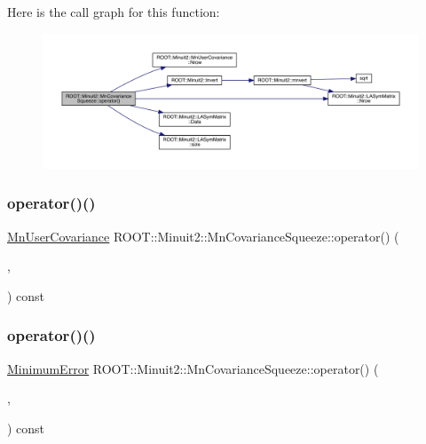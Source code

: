 Here is the call graph for this function\+:\nopagebreak
\begin{figure}[H]
\begin{center}
\leavevmode
\includegraphics[width=350pt]{dc/d44/classROOT_1_1Minuit2_1_1MnCovarianceSqueeze_af75da2b8e6e20a5477a6b0ceac4efb3a_cgraph}
\end{center}
\end{figure}
\mbox{\label{classROOT_1_1Minuit2_1_1MnCovarianceSqueeze_af75da2b8e6e20a5477a6b0ceac4efb3a}} 
\subsubsection{\texorpdfstring{operator()()}{operator()()}\hspace{0.1cm}{\footnotesize\ttfamily [2/6]}}
{\footnotesize\ttfamily \mbox{\hyperlink{classROOT_1_1Minuit2_1_1MnUserCovariance}{Mn\+User\+Covariance}} R\+O\+O\+T\+::\+Minuit2\+::\+Mn\+Covariance\+Squeeze\+::operator() (\begin{DoxyParamCaption}\item[{const \mbox{\hyperlink{classROOT_1_1Minuit2_1_1MnUserCovariance}{Mn\+User\+Covariance}} \&}]{,  }\item[{unsigned int}]{ }\end{DoxyParamCaption}) const}

\mbox{\label{classROOT_1_1Minuit2_1_1MnCovarianceSqueeze_a6f1ea9726d0981faacf7ee0c26326bcd}} 
\subsubsection{\texorpdfstring{operator()()}{operator()()}\hspace{0.1cm}{\footnotesize\ttfamily [3/6]}}
{\footnotesize\ttfamily \mbox{\hyperlink{classROOT_1_1Minuit2_1_1MinimumError}{Minimum\+Error}} R\+O\+O\+T\+::\+Minuit2\+::\+Mn\+Covariance\+Squeeze\+::operator() (\begin{DoxyParamCaption}\item[{const \mbox{\hyperlink{classROOT_1_1Minuit2_1_1MinimumError}{Minimum\+Error}} \&}]{,  }\item[{unsigned int}]{ }\end{DoxyParamCaption}) const}

